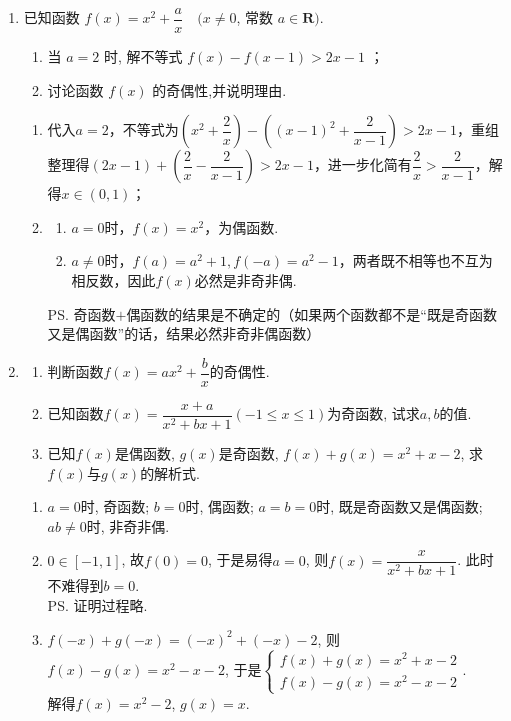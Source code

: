 \begin{enumerate}
\item 已知函数 $f(x)=x^2+\dfrac{a}{x} \quad(x \neq 0$, 常数 $a \in \mathbf{R})$.
\begin{enumerate}
    \item 当 $a=2$ 时, 解不等式 $f(x)-f(x-1)>2 x-1$ ；
    \item 讨论函数 $f(x)$ 的奇偶性,并说明理由.
\end{enumerate}
\begin{jieda}
    \begin{enumerate}
        \item 代入$a = 2$，不等式为$(x^2 + \dfrac{2}{x}) - ((x-1)^2 + \dfrac{2}{x-1}) > 2x-1$，重组整理得$(2x-1) + (\dfrac{2}{x} - \dfrac{2}{x-1}) > 2x-1$，进一步化简有$\dfrac{2}{x} > \dfrac{2}{x-1}$，解得$x \in (0,1)$；
        \item \begin{enumerate}
            \item $a = 0$时，$f(x) = x^2$，为偶函数.
            \item $a \neq 0$时，$f(a) = a^2+1, f(-a) = a^2-1$，两者既不相等也不互为相反数，因此$f(x)$必然是非奇非偶. 
        \end{enumerate}
        \ps 奇函数$+$偶函数的结果是不确定的（如果两个函数都不是“既是奇函数又是偶函数”的话，结果必然非奇非偶函数）
    \end{enumerate}
\end{jieda}
\begin{vspace_}
   \vsp[4] 
\end{vspace_}


\item 
\begin{enumerate}

\item 判断函数$f(x)=ax^2+\dfrac{b}{x}$的奇偶性. 

\item 已知函数$f(x)=\dfrac{x+a}{x^2+bx+1}(-1\leq x\leq 1)$为奇函数, 试求$a,b$的值. 

\item 已知$f(x)$是偶函数, $g(x)$是奇函数, $f(x)+g(x)=x^2+x-2$, 求$f(x)$与$g(x)$的解析式. 

\end{enumerate}
\begin{jieda}
    \begin{enumerate}
        \item $a=0$时, 奇函数; $b=0$时, 偶函数; $a=b=0$时, 既是奇函数又是偶函数; $ab\neq 0$时, 非奇非偶. 
        \item $0\in[-1,1]$, 故$f(0)=0$, 于是易得$a=0$, 则$f(x)=\dfrac{x}{x^2+bx+1}$. 此时不难得到$b=0$. \\
        \ps 证明过程略. 
        \item $f(-x)+g(-x)=(-x)^2+(-x)-2$, 则$f(x)-g(x)=x^2-x-2$, 于是$\begin{cases}
        f(x)+g(x)=x^2+x-2\\
        f(x)-g(x)=x^2-x-2
        \end{cases}$. \\
        解得$f(x)=x^2-2$, $g(x)=x$.
    \end{enumerate}
\end{jieda}


\end{enumerate}

